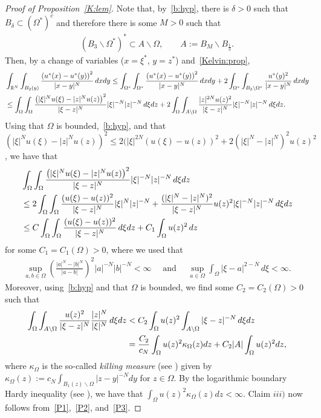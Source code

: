 \documentclass[11pt]{article}
\newcommand{\R}{\mathbb{R}}
\numberwithin{equation}{section}
\begin{document}
\begin{proof}[Proof of Proposition~\ref{K:lem}]
Note that, by~\eqref{b:hyp}, there is $\delta>0$ such that $B_\delta\subset (\Omega^*)^c$ and therefore there is some $M>0$ such that 
\begin{align*}
(B_3\backslash \Omega^*)^*\subset A\backslash \Omega,\qquad A:=B_M\backslash B_\frac{1}{3}.
\end{align*}
Then, by a change of variables ($x = \xi^*$, $y=z^*$) and~\eqref{Kelvin:prop}, 
\begin{align}
    &\int_{\R^N}\int_{B_2(y)} \frac{\left( u^*(x)-u^*(y)\right)^2}{|x-y|^N} \, dx dy 
    \le \int_{\Omega^*} \int_{\Omega^*} \frac{\left( u^*(x)-u^*(y)\right)^2}{|x-y|^N} \, dx dy + 2 \int_{\Omega^*} \int_{B_3 \setminus \Omega^*} \frac{u^*(y)^2}{|x-y|^N} \, dx dy \notag\\
    &\le \int_\Omega \int_\Omega \frac{\left( |\xi|^N u(\xi)-|z|^N u(z) \right)^2}{|\xi-z|^N} |\xi|^{-N} |z|^{-N} \, d\xi dz 
    + 2 \int_\Omega \int_{A\backslash \Omega}\frac{|z|^{2N} u(z)^2}{|\xi-z|^N} |\xi|^{-N} |z|^{-N} \, d\xi dz.\label{P1}
\end{align}
Using that $\Omega$ is bounded,~\eqref{b:hyp}, and that $(|\xi|^N u(\xi)-|z|^N u(z))^2\leq 2(|\xi|^{2N} (u(\xi)-u(z))^2+2(|\xi|^N-|z|^N)^2 u(z)^2$, we have that
\begin{align}
&\int_\Omega \int_\Omega \frac{\left( |\xi|^N u(\xi)-|z|^N u(z) \right)^2}{|\xi-z|^N} |\xi|^{-N} |z|^{-N} \, d\xi dz\notag\\
&\leq 2\int_\Omega \int_\Omega 
\frac{(u(\xi)-u(z))^2}{|\xi-z|^N} |\xi|^{N} |z|^{-N}
+\frac{(|\xi|^N-|z|^N)^2}{|\xi-z|^N}  u(z)^2|\xi|^{-N} |z|^{-N} \, d\xi dz\notag\\
&\leq C\int_\Omega \int_\Omega 
\frac{(u(\xi)-u(z))^2}{|\xi-z|^N} \, d\xi dz
+C_1\int_\Omega  u(z)^2 \, dz\label{P2}
\end{align}
for some $C_1=C_1(\Omega)>0$, where we used that
\begin{align*}
\sup_{a,b\in \Omega}\left(\frac{|a|^N-|b|^N}{|a-b|}\right)^2|a|^{-N}|b|^{-N}<\infty\quad \text{ and }\quad \sup_{a\in\Omega}\int_\Omega |\xi-a|^{2-N}\, d\xi<\infty.
\end{align*}
Moreover, using~\eqref{b:hyp} and that $\Omega$ is bounded, we find some $C_2=C_2(\Omega)>0$ such that
\begin{align}
\int_\Omega \int_{A\backslash \Omega}\frac{u(z)^2}{|\xi-z|^N}  \frac{|z|^{N}}{|\xi|^{N}} \, d\xi dz
&< C_2 \int_\Omega u(z)^2 \int_{A\backslash \Omega} |\xi-z|^{-N}\, d\xi dz\notag\\
&= \frac{C_2}{c_N} \int_\Omega u(z)^2 \kappa_\Omega(z)dz
+C_2 |A|\int_\Omega u(z)^2  dz,\label{P3}
\end{align}
where $\kappa_\Omega$ is the so-called \emph{killing measure} (see \cite[eq. (3.5)]{CW19}) given by 
$\kappa_{\Omega}(z):=c_N \int_{B_1(z) \backslash \Omega} |z-y|^{-N} dy$ for $z\in \Omega.$  By the logarithmic boundary Hardy inequality (see \cite[Remark 4.3 and Corollary A.2]{CW19}), we have that $\int_\Omega u(z)^2 \kappa_\Omega(z)dz<\infty$.  Claim $iii)$ now follows from~\eqref{P1},~\eqref{P2}, and~\eqref{P3}.
\end{proof}
\end{document}
